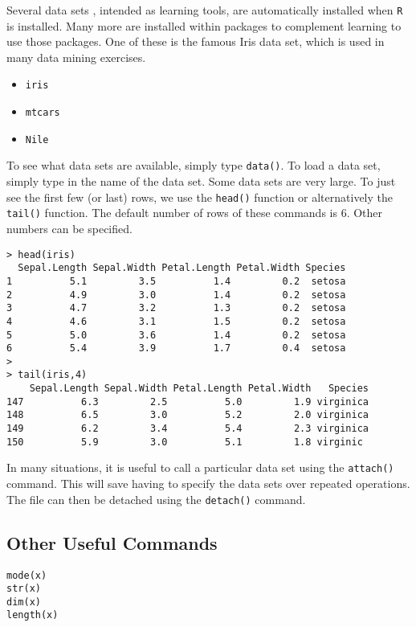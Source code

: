 \documentclass[12pt]{article}
\begin{document}
Several data sets , intended as learning tools, are automatically installed when \texttt{R} is installed. Many more are installed within packages to complement learning to use those packages. One of these is the famous Iris data set, which is used in many data mining exercises.
\begin{itemize}
\item \texttt{iris}
\item \texttt{mtcars}
\item \texttt{Nile}
\end{itemize}
To see what data sets are available, simply type \texttt{data()}.
To load a data set, simply type in the name of the data set. Some data sets are very large. To just see the first few (or last)  rows, we use the \texttt{head()} function or alternatively the \texttt{tail()} function. The default number of rows of these commands is 6. Other numbers can be specified.
\begin{verbatim} 
> head(iris)
  Sepal.Length Sepal.Width Petal.Length Petal.Width Species
1          5.1         3.5          1.4         0.2  setosa
2          4.9         3.0          1.4         0.2  setosa
3          4.7         3.2          1.3         0.2  setosa
4          4.6         3.1          1.5         0.2  setosa
5          5.0         3.6          1.4         0.2  setosa
6          5.4         3.9          1.7         0.4  setosa
>
> tail(iris,4)
    Sepal.Length Sepal.Width Petal.Length Petal.Width   Species
147          6.3         2.5          5.0         1.9 virginica
148          6.5         3.0          5.2         2.0 virginica
149          6.2         3.4          5.4         2.3 virginica
150          5.9         3.0          5.1         1.8 virginic
\end{verbatim}
In many situations, it is useful to call a particular data set using the \texttt{attach()} command. This will save having to specify the data sets over repeated operations. The file can then be detached using 
 the \texttt{detach()} command.



\subsection*{Other Useful Commands}
\begin{framed}
\begin{verbatim}
mode(x)
str(x)
dim(x)
length(x)
\end{verbatim}	
\end{framed}
\end{document}
